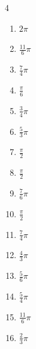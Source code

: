 \begin{multicols}{4}
\begin{enumerate}
  \item $\displaystyle 2\pi$

  \item $\displaystyle \frac{11}{6}\pi$

  \item $\displaystyle \frac{7}{4}\pi$

  \item $\displaystyle \frac{\pi}{6}$

\columnbreak %

  \item $\displaystyle \frac{3}{4}\pi$

  \item $\displaystyle \frac{5}{3}\pi$

  \item $\displaystyle \frac{\pi}{2}$

  \item $\displaystyle \frac{\pi}{2}$

  \item $\displaystyle \frac{7}{6}\pi$

  \item $\displaystyle \frac{\pi}{2}$

  \item $\displaystyle \frac{7}{4}\pi$

  \item $\displaystyle \frac{4}{3}\pi$

  \item $\displaystyle \frac{5}{6}\pi$

  \item $\displaystyle \frac{5}{4}\pi$

  \item $\displaystyle \frac{11}{6}\pi$

  \item $\displaystyle \frac{2}{3}\pi$


\end{enumerate}
\end{multicols}
